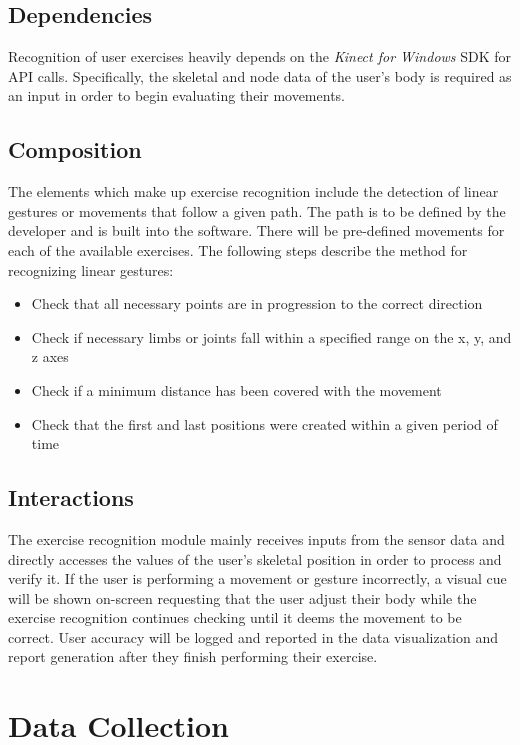 \documentclass[onecolumn, draftclsnofoot,10pt, compsoc]{IEEEtran}
\begin{document}
\subsection{Dependencies}
Recognition of user exercises heavily depends on the \textit{Kinect for Windows} SDK for API calls. Specifically, the skeletal and node data of the user's body is required as an input in order to begin evaluating their movements. 

\subsection{Composition}
The elements which make up exercise recognition include the detection of linear gestures or movements that follow a given path. The path is to be defined by the developer and is built into the software. There will be pre-defined movements for each of the available exercises. The following steps describe the method for recognizing linear gestures: 
\begin{itemize}
\item Check that all necessary points are in progression to the correct direction 
\item Check if necessary limbs or joints fall within a specified range on the x, y, and z axes 
\item Check if a minimum distance has been covered with the movement 
\item Check that the first and last positions were created within a given period of time 
\end{itemize}


\subsection{Interactions}
The exercise recognition module mainly receives inputs from the sensor data and directly accesses the values of the user's skeletal position in order to process and verify it. If the user is performing a movement or gesture incorrectly, a visual cue will be shown on-screen requesting that the user adjust their body while the exercise recognition continues checking until it deems the movement to be correct. User accuracy will be logged and reported in the data visualization and report generation after they finish performing their exercise. 

\section{Data Collection}
\end{document}

